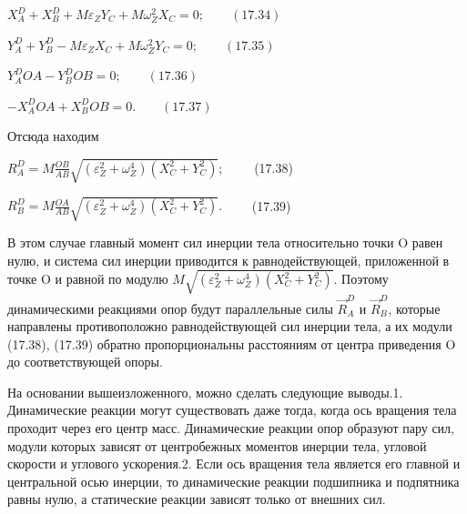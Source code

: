 {\begin{center}
	 \par$ X_A^D + X_B^D + M \varepsilon_Z Y_C + M \omega_Z^2 X_C = 0; \qquad (17.34)$
	 \par$ Y_A^D + Y_B^D - M \varepsilon_Z X_C + M \omega_Z^2 Y_C = 0; \qquad (17.35)$
	 \par$ Y_A^D OA - Y_B^D OB = 0; \qquad (17.36)$
	 \par$ -X_A^D OA + X_B^D OB = 0. \qquad (17.37)$

	 \par Отсюда находим

	 \par $R_A^D = M \frac{OB}{AB} \sqrt{(\varepsilon_Z^2 + \omega_Z^4)(X_C^2 + Y_C^2)}; \qquad$ (17.38)
  
	 \par $R_B^D = M \frac{OA}{AB} \sqrt{(\varepsilon_Z^2 + \omega_Z^4)(X_C^2 + Y_C^2)}. \qquad$ (17.39)

	 \par В этом случае главный момент сил инерции тела относительно точки O равен нулю, и система сил инерции приводится к равнодействующей, приложенной в точке O и равной по модулю $M \sqrt{(\varepsilon_Z^2 + \omega_Z^4)(X_C^2 + Y_C^2)}$. Поэтому динамическими реакциями опор будут параллельные силы $\vec R_A^D$ и $\vec R_B^D$, которые направлены противоположно равнодействующей сил инерции тела, а их модули (17.38), (17.39) обратно пропорциональны расстояниям от центра приведения O до соответствующей опоры.
	 
	 \par На основании вышеизложенного, можно сделать следующие выводы.1. Динамические реакции могут существовать даже тогда, когда ось вращения тела проходит через его центр масс. Динамические реакции опор образуют пару сил, модули которых зависят от центробежных моментов инерции тела, угловой скорости и углового ускорения.2.  Если  ось  вращения  тела  является  его  главной  и  центральной  осью инерции, то динамические реакции подшипника и подпятника равны нулю, а статические реакции зависят только от внешних сил.
\end{center}
}
